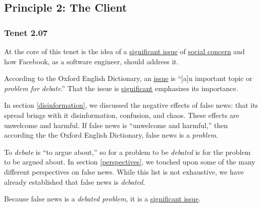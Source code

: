 
\subsection{Principle 2: The Client}

\subsubsection{Tenet 2.07}


\par At the core of this tenet is the idea of a \ul{significant issue} of \ul{social concern} and how Facebook, as a software engineer, should address it.


\par According to the Oxford English Dictionary, an \ul{issue} is ``[a]n important topic or \emph{problem for debate}.'' \cite{oxford} That the issue is \ul{significant} emphasizes its importance.

\par In section \ref{disinformation}, we discussed the negative effects of false news: that its spread brings with it disinformation, confusion, and chaos. These effects are unwelcome and harmful. If false news is ``unwelcome and harmful,'' then according the the Oxford English Dictionary, false news is a \emph{problem}. \cite{oxford}

\par To \emph{debate} is ``to argue about,'' \cite{oxford} so for a problem to be \emph{debated} is for the problem to be argued about. In section \ref{perspectives}, we touched upon some of the many different perspectives on false news. While this list is not exhaustive, we have already established that false news is \emph{debated}.

\par Because false news is a \emph{debated problem}, it is a \ul{significant issue}.


